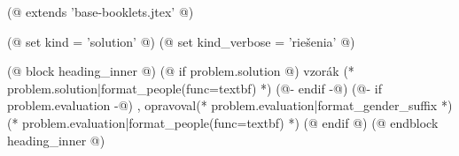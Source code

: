 (@ extends 'base-booklets.jtex' @)

(@ set kind = 'solution' @)
(@ set kind_verbose = 'riešenia' @)

(@ block heading_inner @)
    (@ if problem.solution @)%
        vzorák (* problem.solution|format_people(func=textbf) *)%
    (@- endif -@)%
    (@- if problem.evaluation -@)%
        , opravoval(* problem.evaluation|format_gender_suffix *) (* problem.evaluation|format_people(func=textbf) *)%
    (@ endif @)%
(@ endblock heading_inner @)
